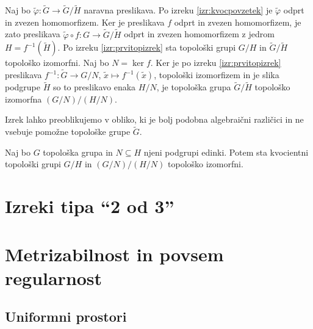 \documentclass[mat1]{fmfdelo}
\begin{document}
\begin{dokaz}
Naj bo $\tilde{\varphi}\colon \widetilde{G} \to \widetilde{G}/\widetilde{H}$ naravna preslikava. Po izreku \ref{izr:kvocpovzetek} je $\tilde{\varphi}$ odprt in zvezen homomorfizem. Ker je preslikava $f$ odprt in zvezen homomorfizem, je zato preslikava $\tilde{\varphi}\circ f\colon G \to \widetilde{G}/\widetilde{H}$ odprt in zvezen homomorfizem z jedrom $H = f^{-1}(\widetilde{H})$. Po izreku \ref{izr:prvitopizrek} sta topološki grupi $G/H$ in $\widetilde{G}/\widetilde{H}$ topološko izomorfni. Naj bo $N = \ker f$. Ker je po izreku \ref{izr:prvitopizrek} preslikava $f^{-1}\colon \widetilde{G} \to G/N$, $\tilde{x} \mapsto f^{-1}(\tilde{x})$, topološki izomorfizem in je slika podgrupe $\widetilde{H}$ so to preslikavo enaka $H/N$, je topološka grupa $\widetilde{G}/\widetilde{H}$ topološko izomorfna $(G/N)/(H/N)$.
\end{dokaz}

Izrek lahko preoblikujemo v obliko, ki je bolj podobna algebraični različici in ne vsebuje pomožne topološke grupe $\widetilde{G}$.
\begin{izrek}\label{izr:tretjitopizrek}
Naj bo $G$ topološka grupa in $N \subseteq H$ njeni podgrupi edinki. Potem sta kvocientni topološki grupi $G/H$ in $(G/N)/(H/N)$ topološko izomorfni.
\end{izrek}

\section{Izreki tipa ``2 od 3''}

\section{Metrizabilnost in povsem regularnost}

\subsection{Uniformni prostori}
\end{document}
